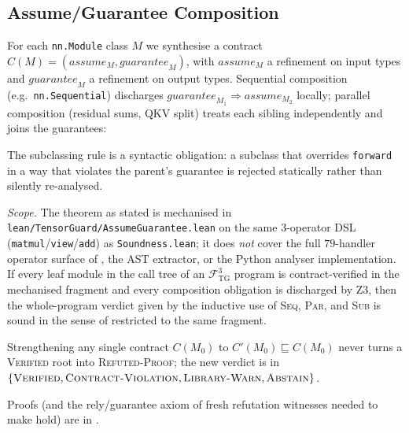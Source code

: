 \subsection{Assume/Guarantee Composition}
\label{sec:assume-guarantee}

For each \texttt{nn.Module} class $M$ we synthesise a contract
$C(M)=(\mathit{assume}_M,\mathit{guarantee}_M)$, with
$\mathit{assume}_M$ a refinement on input types and
$\mathit{guarantee}_M$ a refinement on output types. Sequential
composition (e.g.\ \texttt{nn.Sequential}) discharges
$\mathit{guarantee}_{M_1}\!\Rightarrow\!\mathit{assume}_{M_2}$
locally; parallel composition (residual sums, QKV split) treats
each sibling independently and joins the guarantees:

{\small
{}}

\noindent The subclassing rule is a syntactic obligation: a
subclass that overrides \texttt{forward} in a way that violates
the parent's guarantee is rejected statically rather than
silently re-analysed.

\begin{theorem}\label{thm:ag-sound}
\emph{Scope.} The theorem as stated is mechanised in
\texttt{lean/TensorGuard/AssumeGuarantee.lean} on the same
$3$-operator DSL (\texttt{matmul}/\texttt{view}/\texttt{add})
as \texttt{Soundness.lean}; it does \emph{not} cover the full
$79$-handler operator surface of ,
the AST extractor, or the Python analyser implementation.
If every leaf module in the call tree of an
$\mathcal{F}_{\mathrm{TG}}^{3}$ program is contract-verified
in the mechanised fragment and every composition obligation
is discharged by Z3, then the whole-program verdict given by
the inductive use of \textsc{Seq}, \textsc{Par}, and
\textsc{Sub} is sound in the sense of 
restricted to the same fragment.
\end{theorem}

\begin{theorem}\label{thm:monotonicity}
Strengthening any single contract $C(M_0)$ to $C'(M_0)\sqsubseteq
C(M_0)$ never turns a \textsc{Verified} root into
\textsc{Refuted-Proof}; the new verdict is in
$\{\textsc{Verified},\textsc{Contract-Violation},
\textsc{Library-Warn},\textsc{Abstain}\}$.
\end{theorem}

Proofs (and the rely/guarantee axiom of fresh refutation
witnesses needed to make  hold) are in
.
